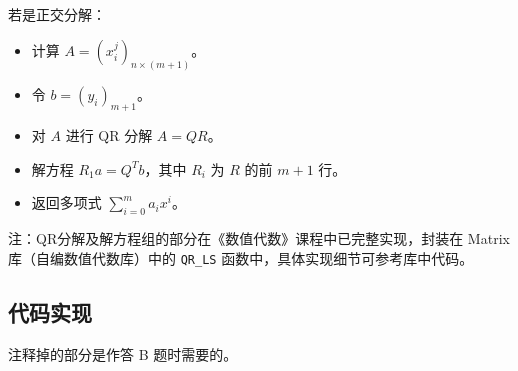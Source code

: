 \documentclass{ctexart}
\begin{document}
若是正交分解：
\begin{itemize}
\item 计算 $A=(x_i^j)_{n\times (m+1)}$。
\item 令 $b=(y_i)_{m+1}$。
\item 对 $A$ 进行 QR 分解 $A=QR$。
\item 解方程 $R_1a=Q^Tb$，其中 $R_i$ 为 $R$ 的前 $m+1$ 行。
\item 返回多项式 $\sum_{i=0}^ma_ix^i$。
\end{itemize}

注：QR分解及解方程组的部分在《数值代数》课程中已完整实现，封装在 Matrix 库（自编数值代数库）中的 \verb|QR_LS| 函数中，具体实现细节可参考库中代码。

\subsection{代码实现}
注释掉的部分是作答 B 题时需要的。
\end{document}
